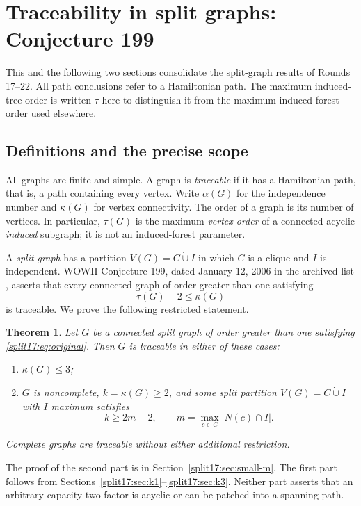 \documentclass[11pt,a4paper]{article}
\newtheorem{theorem}{Theorem}[section]
\theoremstyle{definition}\newtheorem{definition}[theorem]{Definition}
\theoremstyle{remark}\newtheorem{remark}[theorem]{Remark}
\begin{document}
\section{Traceability in split graphs: Conjecture 199}
\label{sec:split-small}
This and the following two sections consolidate the split-graph results
of Rounds 17--22. All path conclusions refer to a Hamiltonian path.
The maximum induced-tree order is written $\tau$ here to distinguish
it from the maximum induced-forest order used elsewhere.


\subsection{Definitions and the precise scope}
All graphs are finite and simple. A graph is \emph{traceable} if it has a
Hamiltonian path, that is, a path containing every vertex. Write $\alpha(G)$
for the independence number and $\kappa(G)$ for vertex connectivity.
The order of a graph is its number of vertices. In particular,
$\tau(G)$ is the maximum \emph{vertex order} of a connected acyclic
\emph{induced} subgraph; it is not an induced-forest parameter.

A \emph{split graph} has a partition $V(G)=C\mathbin{\dot\cup}I$ in which
$C$ is a clique and $I$ is independent. WOWII Conjecture 199, dated
January 12, 2006 in the archived list \cite{src:catalogue}, asserts that every
connected graph of order greater than one satisfying
\begin{equation}\label{split17:eq:original}
 \tau(G)-2\le\kappa(G)
\end{equation}
is traceable. We prove the following restricted statement.

\begin{theorem}\label{split17:thm:main}
Let $G$ be a connected split graph of order greater than one satisfying
\eqref{split17:eq:original}. Then $G$ is traceable in either of these cases:
\begin{enumerate}
\item $\kappa(G)\le3$;
\item $G$ is noncomplete, $k=\kappa(G)\ge2$, and some split partition
$V(G)=C\mathbin{\dot\cup}I$ with $I$ maximum satisfies
\[
 k\ge2m-2,\qquad m=\max_{c\in C}|N(c)\cap I|.
\]
\end{enumerate}
Complete graphs are traceable without either additional restriction.
\end{theorem}

The proof of the second part is in Section~\ref{split17:sec:small-m}. The first
part follows from Sections~\ref{split17:sec:k1}--\ref{split17:sec:k3}. Neither part asserts
that an arbitrary capacity-two factor is acyclic or can be patched into
a spanning path.
\end{document}
